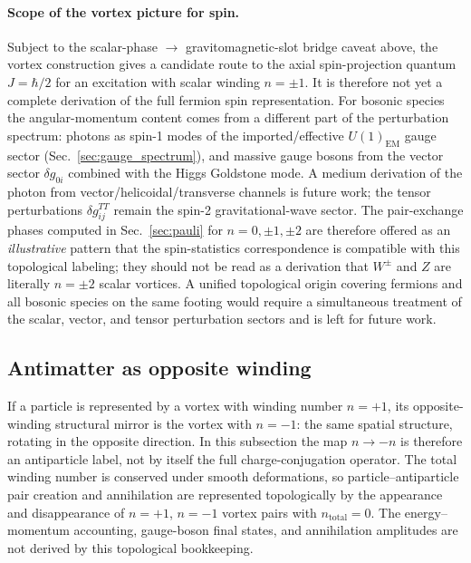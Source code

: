 \documentclass[aps,prd,onecolumn,superscriptaddress,nofootinbib,showpacs,12pt,notitlepage]{revtex4-2}
\begin{document}
\paragraph{Scope of the vortex picture for spin.}
Subject to the scalar-phase $\to$ gravitomagnetic-slot
bridge caveat above, the vortex construction gives a
candidate route to the axial spin-projection quantum
$J = \hbar/2$ for an excitation with scalar winding
$n=\pm 1$.  It is therefore not yet a complete derivation
of the full fermion spin representation.
For bosonic species the angular-momentum content comes
from a different part of the perturbation spectrum:
photons as spin-1 modes of the imported/effective
$U(1)_{\mathrm{EM}}$ gauge sector
(Sec.~\ref{sec:gauge_spectrum}), and massive gauge
bosons from the vector sector $\delta g_{0i}$ combined
with the Higgs Goldstone mode.  A medium derivation of
the photon from vector/helicoidal/transverse channels is
future work; the tensor perturbations
$\delta g_{ij}^{TT}$ remain the spin-2 gravitational-wave
sector.  The pair-exchange phases computed in
Sec.~\ref{sec:pauli} for $n = 0, \pm 1, \pm 2$ are
therefore offered as an \emph{illustrative} pattern that
the spin-statistics correspondence is compatible with
this topological labeling; they should not be read as a
derivation that $W^{\pm}$ and $Z$ are literally $n=\pm 2$
scalar vortices.  A unified topological origin covering
fermions and all bosonic species on the same footing
would require a simultaneous treatment of the scalar,
vector, and tensor perturbation sectors and is left for
future work.

\subsection{Antimatter as opposite winding}
\label{sec:antimatter}

If a particle is represented by a vortex with winding number
$n = +1$, its opposite-winding structural mirror is the vortex
with $n = -1$: the same spatial structure, rotating in the
opposite direction.  In this subsection the map $n\to -n$ is
therefore an antiparticle label, not by itself the full
charge-conjugation operator.
The total winding number is conserved under smooth
deformations, so particle--antiparticle pair creation
and annihilation are represented topologically by the
appearance and disappearance of $n = +1$, $n = -1$
vortex pairs with $n_{\mathrm{total}} = 0$.  The
energy--momentum accounting, gauge-boson final states,
and annihilation amplitudes are not derived by this
topological bookkeeping.
\end{document}
